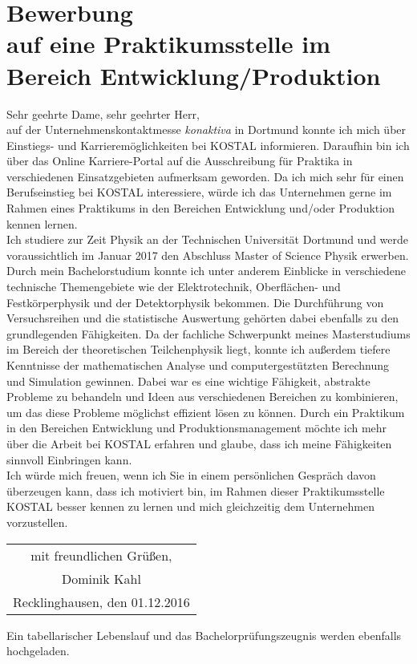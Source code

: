 \documentclass[12pt]{scrartcl}
\begin{document}
\pagestyle{empty}

\section*{Bewerbung \\
auf eine Praktikumsstelle im Bereich Entwicklung/Produktion}

\vspace{0.7in}

Sehr geehrte Dame, sehr geehrter Herr,
\\

auf der Unternehmenskontaktmesse \textit{konaktiva} in Dortmund konnte 
ich mich über Ein\-stiegs- und 
Karrieremöglichkeiten bei KOSTAL informieren. Daraufhin bin ich über das 
Online Karriere-Portal auf die Ausschreibung für Praktika in verschiedenen Einsatzgebieten aufmerksam geworden. Da ich mich sehr für einen 
Berufseinstieg bei KOSTAL interessiere, würde ich das Unternehmen gerne im 
Rahmen eines Praktikums in den Bereichen Entwicklung und/oder Produktion 
kennen lernen.
\\

Ich studiere zur Zeit Physik an der Technischen Universität Dortmund und 
werde voraussichtlich im Januar 2017 den Abschluss Master of Science Physik 
erwerben. Durch mein Bachelorstudium konnte ich unter anderem Einblicke in 
verschiedene 
technische Themengebiete wie der Elektrotechnik, Oberflächen- und 
Festkörperphysik und der Detektorphysik bekommen. Die Durchführung von 
Versuchsreihen und die 
statistische Auswertung gehörten dabei ebenfalls zu den grundlegenden 
Fähigkeiten. Da der fachliche Schwerpunkt 
meines Masterstudiums im Bereich der theoretischen Teilchenphysik liegt, konnte 
ich außerdem tiefere Kenntnisse der mathematischen Analyse und 
computergestützten Berechnung und Simulation gewinnen. Dabei war es eine 
wichtige Fähigkeit, 
abstrakte Probleme zu behandeln und Ideen aus verschiedenen Bereichen zu 
kombinieren, um das diese Probleme möglichst effizient lösen zu können. 
Durch ein Praktikum in den Bereichen Entwicklung und Produktionsmanagement 
möchte ich mehr über die Arbeit bei KOSTAL erfahren und glaube, dass ich meine 
Fähigkeiten sinnvoll Einbringen kann.
\\

Ich würde mich freuen, wenn ich Sie in einem persönlichen Gespräch davon 
überzeugen kann, dass ich motiviert bin, im Rahmen dieser Praktikumsstelle 
KOSTAL besser kennen zu lernen und mich gleichzeitig dem 
Unternehmen vorzustellen.
\\[0.2cm]

\begin{flushright}
\begin{tabular}{c}
mit freundlichen Grüßen, 		\\[0.3cm]
Dominik Kahl 					\\[0.3cm]
Recklinghausen, den 01.12.2016 	\\[0.3cm]
\end{tabular}
\end{flushright}

Ein tabellarischer Lebenslauf und das Bachelorprüfungszeugnis werden ebenfalls 
hochgeladen.
\end{document}
